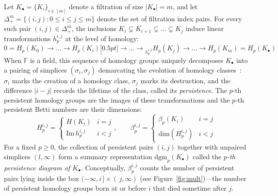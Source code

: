 Let $K_\bullet = \{K_i\}_{i\in [m]}$ denote a filtration of size $\lvert K_\bullet \rvert = m$, 
and let $\Delta_{+}^m = \{ (i,j) : 0 \leq i \leq j \leq m \}$ denote the set of filtration index pairs. 
For every such pair $(i,j) \in \Delta_{+}^m$, the inclusions $K_i \subsetneq K_{i+1} \subsetneq \dots \subsetneq K_j$ induce linear transformations $h_p^{i,j}$  at the level of homology:
\begin{equation}\label{eq:hom_map}
	0 = H_p(K_0) \to \dots \to H_p(K_i) \underbracket[0.5pt]{\to \dots \to}_{h_p^{i,j}} H_p(K_j) \to \dots \to H_p(K_m) = H_p(K_\bullet) 
\end{equation}
When $\mathbb{F}$ is a field, this sequence of homology groups uniquely decomposes $K_\bullet$ into a pairing of simplices $(\sigma_i, \sigma_j)$ demarcating the evolution of homology classes~\cite{zomorodian2004computing}: $\sigma_i$ marks the creation of a homology class, $\sigma_j$ marks its destruction, and the difference $\lvert i - j \rvert$ records the lifetime of the class, called its \emph{persistence}.
The $p$-th persistent homology groups are the images of these transformations and the $p$-th persistent Betti numbers are their dimensions:
\begin{equation}
	H_{p}^{i,j} = \begin{cases}
	H(K_i) & i = j \\ 
 	\mathrm{Im}\,h_p^{i,j} & i < j
 \end{cases}
, \quad \quad 
\beta_p^{i,j} = \begin{cases}
 	\beta_p(K_i) & i = j \\
 	\mathrm{dim}(H_{p}^{i,j}) & i < j
 \end{cases}
\end{equation}
For a fixed $p \geq 0$, the collection of persistent pairs $(i, j)$ together with unpaired simplices $(l, \infty)$ form a summary representation $\mathrm{dgm}_p(K_\bullet)$ called the \emph{$p$-th persistence diagram of $K_\bullet$}. Conceptually, $\beta_p^{i,j}$ counts the number of persistent pairs lying inside the box $(-\infty, i\,] \times (\,j, \infty)$ (see Figure~\ref{fig:mult})---the number of persistent homology groups born at or before $i$ that died sometime after $j$. 




